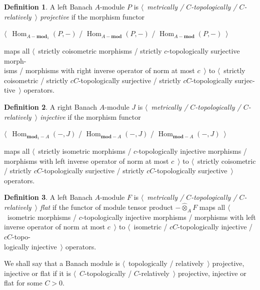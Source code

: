 \documentclass{article}
\theoremstyle{plain}
\theoremstyle{definition}
\newtheorem{definition}{Definition}
\newcommand{\projtens}{\mathbin{\widehat{\otimes}}}
\begin{document}
\begin{fulltext}
\begin{definition} A left Banach $A$-module $P$ is \emph{$\langle$~metrically / 
$C$-topologically / $C$-relatively~$\rangle$ projective} if the morphism functor
\begin{center}
$\langle$~$\operatorname{Hom}_{A-\mathbf{mod}_1}(P,-)$ / 
$\operatorname{Hom}_{A-\mathbf{mod}}(P,-)$ / 
$\operatorname{Hom}_{A-\mathbf{mod}}(P,-)$~$\rangle$
\end{center}
maps all $\langle$~strictly 
coisometric morphisms / strictly $c$-topologically surjective morph-\\isms / 
morphisms with right inverse operator of norm at most $c$~$\rangle$ to 
$\langle$~strictly coisometric / strictly $c C$-topologically surjective / 
strictly $c C$-topologically surjec-\\tive~$\rangle$ operators.
\end{definition}

\begin{definition} A right Banach $A$-module $J$ is \emph{$\langle$~metrically /
$C$-topologically / $C$-relatively~$\rangle$ injective} if the morphism functor
\begin{center}
$\langle$~$\operatorname{Hom}_{\mathbf{mod}_1-A}(-,J)$ / 
$\operatorname{Hom}_{\mathbf{mod}-A}(-,J)$ / 
$\operatorname{Hom}_{\mathbf{mod}-A}(-,J)$~$\rangle$    
\end{center}
maps all $\langle$~strictly isometric 
morphisms / $c$-topologically injective morphisms / morphisms with left inverse 
operator of norm at most $c$~$\rangle$ to $\langle$~strictly coisometric / 
strictly $c C$-topologically surjective / strictly $c C$-topologically 
surjective~$\rangle$ operators.
\end{definition}

\begin{definition} A left Banach $A$-module $F$ is \emph{$\langle$~metrically / 
$C$-topologically / $C$-relatively~$\rangle$ flat} if the functor of module tensor 
product $-\projtens_A F$ 
maps all $\langle$~isometric morphisms / $c$-topologically injective morphisms / 
morphisms with left inverse operator of norm at most $c$~$\rangle$ to 
$\langle$~isometric / $cC$-topologically injective / $cC$-topo-\\logically 
injective~$\rangle$ operators.
\end{definition}

We shall say that a Banach module is $\langle$~topologically / 
relatively~$\rangle$ projective, injective or flat if it is 
$\langle$~$C$-topologically / $C$-relatively~$\rangle$ projective, injective or 
flat for some $C>0$.


\end{fulltext}
\end{document}
